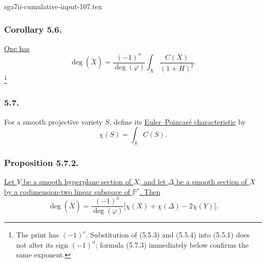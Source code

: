 \begin{filecontents*}{sga7ii-cumulative-input-107.tex}
\subsubsection*{Corollary 5.6.}
\underline{One has}
\begin{equation}\tag{5.6.1}
\deg(\check X)
=\frac{(-1)^n}{\deg(\varphi)}
\int_X\frac{C(X)}{(1+H)^2}.
\end{equation}
\footnote{The print has $(-1)^r$.  Substitution of (5.5.3) and
(5.5.4) into (5.5.1) does not alter its sign $(-1)^n$; formula
(5.7.3) immediately below confirms the same exponent.}

\subsubsection*{5.7.}
For a smooth projective variety $S$, define its
\underline{Euler--Poincaré characteristic} by
\begin{equation}\tag{5.7.1}
\chi(S)=\int_SC(S).
\end{equation}

\subsubsection*{Proposition 5.7.2.}
\underline{Let $Y$ be a smooth hyperplane section of $X$, and let
$\Delta$ be a smooth section of $X$ by a codimension-two linear
subspace of $\mathbb P^r$.  Then}
\begin{equation}\tag{5.7.3}
\deg(\check X)
=\frac{(-1)^n}{\deg(\varphi)}
\bigl[\chi(X)+\chi(\Delta)-2\chi(Y)\bigr].
\end{equation}

\end{filecontents*}
